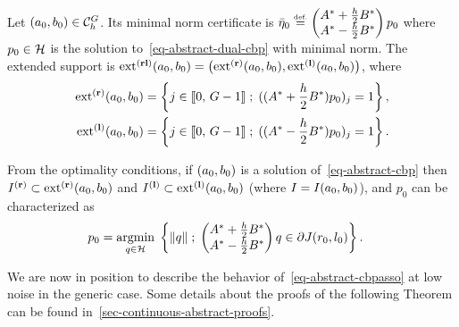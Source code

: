 \begin{defn}
  Let $(a_0,b_0)\in \mathcal{C}_h^G$. Its minimal norm certificate is $\bar{\eta}_0 \stackrel{\mbox{\upshape\tiny def.}}{=} \begin{pmatrix}
    {A}^* +\frac{h}{2} {B}^*\\
    {A}^* -\frac{h}{2} {B}^*
  \end{pmatrix} p_0$ where $p_0\in\mathcal{H}$ is the solution to~\eqref{eq-abstract-dual-cbp} with minimal norm.
  The extended support is $\operatorname{ext^{\mathbf{(rl)}}} (a_0,b_0)=\left(\operatorname{ext^{\mathbf{(r)}}}(a_0,b_0),\operatorname{ext^{\mathbf{(l)}}}(a_0,b_0)\right)$, where 
\begin{align}
  \operatorname{ext^{\mathbf{(r)}}}(a_0,b_0)&=\left\{ j\in\llbracket 0,\,G-1 \rrbracket \;;\; (({A}^* +\frac{h}{2} {B}^*)p_0)_j=1   \right\},\\
  \operatorname{ext^{\mathbf{(l)}}}(a_0,b_0)&=\left\{ j\in\llbracket 0,\,G-1 \rrbracket \;;\;  (({A}^* -\frac{h}{2} {B}^*)p_0)_j=1 \right\}.
\end{align}
\end{defn}

From the optimality conditions, if $(a_0,b_0)$ is a solution of~\eqref{eq-abstract-cbp} then ${I^{\mathbf{(r)}}} \subset \operatorname{ext^{\mathbf{(r)}}}(a_0,b_0)$ and ${I^{\mathbf{(l)}}}\subset \operatorname{ext^{\mathbf{(l)}}}(a_0,b_0)$
(where $I=I(a_0,b_0)$), and $p_0$ can be characterized as
\begin{align}
    p_0 &= \underset{q\in \mathcal{H}}{\operatorname{argmin}}\; \left\{ \|q\| \;;\; \begin{pmatrix}
    {A}^* +\frac{h}{2} {B}^*\\
    {A}^* -\frac{h}{2} {B}^*
  \end{pmatrix} q\in\partial J(r_0,l_0) \right\}.
\end{align}

We are now in position to describe the behavior of~\eqref{eq-abstract-cbpasso} at low  noise in the generic case. Some details about the proofs of the following Theorem can be found in~\ref{sec-continuous-abstract-proofs}. 

